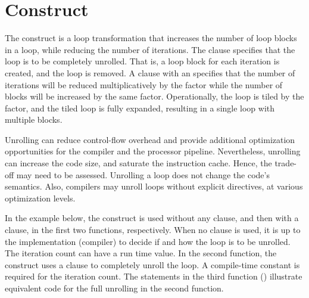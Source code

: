 \section{ Construct}
\label{sec:unroll}

The  construct is a loop transformation that increases the 
number of loop blocks in a loop, while reducing the number of iterations.
The  clause specifies that the loop is to be completely unrolled.  
That is, a loop block for each iteration is created, and the loop is removed.
A  clause  with an  specifies that the number of
iterations will be reduced multiplicatively by the factor while the number of 
blocks will be increased by the same factor.  
Operationally, the loop is tiled by the factor, and the tiled loop is 
fully expanded, resulting in a single loop with multiple blocks.

Unrolling can reduce control-flow overhead and provide additional
optimization opportunities for the compiler and the processor
pipeline. Nevertheless, unrolling can increase the code size, and saturate
the instruction cache. Hence, the trade-off may need to be assessed.
Unrolling a loop does not change the code's semantics. Also, compilers
may unroll loops without explicit directives, at various optimization levels.

In the example below, the  construct is used without any clause, and then
with a  clause, in the first two functions, respectively.
When no clause is used, it is up to the implementation (compiler) 
to decide if and how the loop is to be unrolled.  
The iteration count can have a run time value.  
In the second function, the  construct uses a  clause
to completely unroll the loop.  A compile-time constant is required for the iteration count.
The statements in the third function () illustrate
equivalent code for the full unrolling in the second function.



